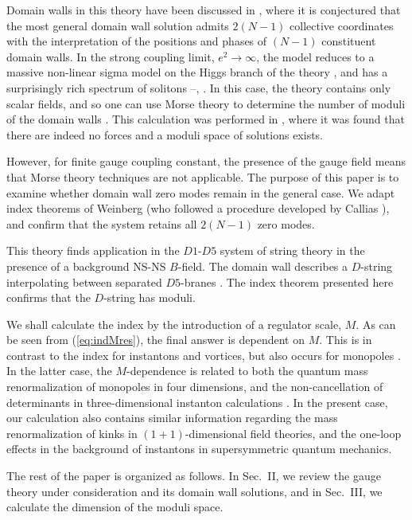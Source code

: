 \documentclass[a4paper,preprint,preprintnumbers,amsmath,amssymb]{revtex4}
\begin{document}
Domain walls in this theory have been discussed in \cite{DT02}, where it is 
conjectured that the most general domain wall solution admits $2(N-1)$ 
collective coordinates with the interpretation of the positions and phases 
of $(N-1)$ constituent domain walls. 
In the strong coupling limit, $e^2 \rightarrow \infty$, the model reduces
to a massive non-linear sigma model on the 
Higgs branch of the theory \cite{ew93}, and has a surprisingly rich 
spectrum of solitons \cite{ea92}--\cite{NNS02}, \cite{DT02}. 
In this case, the theory contains only scalar fields,
and so one can use Morse theory to determine the number of moduli of the
domain walls \cite{ew82}. This  calculation was performed in \cite{GTT01b}, 
where it was found that there are indeed no forces and a moduli space of
solutions exists. 

However, for finite gauge coupling constant, the presence of the gauge field
means that Morse theory techniques are not applicable.
The purpose of this paper is to examine whether domain wall zero modes remain 
in the general case. 
We adapt index theorems of Weinberg (who followed a procedure developed by
Callias \cite{cjc78}), and confirm that
the system retains all $2(N-1)$ zero modes.

This theory finds application in the $D1$-$D5$ system of string theory 
in the presence of a background NS-NS $B$-field. The domain wall 
describes a $D$-string interpolating between separated $D5$-branes 
\cite{BT99,LT00}. 
The index theorem presented here confirms that the $D$-string has 
moduli. 

We shall calculate the index by the introduction of a regulator 
scale, $M$. As can be seen from (\ref{eq:indMres}), the final answer 
is dependent on $M$. This is in contrast to the index for instantons 
and vortices, but also occurs for monopoles \cite{ejw79}. In 
the latter case, the $M$-dependence is related to both the quantum mass 
renormalization of monopoles \cite{rkk84} in four dimensions, 
and the non-cancellation of determinants in three-dimensional 
instanton calculations \cite{DKMTV97}. In the present case, our 
calculation also contains similar information regarding the 
mass renormalization of kinks in $(1+1)$-dimensional field theories, 
and the one-loop effects in the background of instantons 
in supersymmetric quantum mechanics.
	


The rest of the paper is organized as follows.
In Sec.~II, we review the gauge theory under consideration and 
its domain wall solutions, and in Sec.~III, we calculate the 
dimension of the moduli space. 
\end{document}
